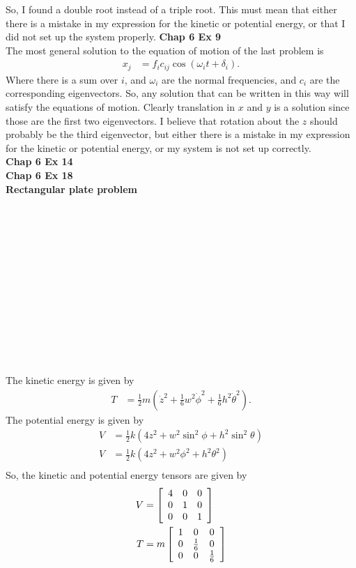 \documentclass[10pt]{article}
\begin{document}
So, I found a double root instead of a triple root.  This must mean that either
there is a mistake in my expression for the kinetic or potential energy, or that
I did not set up the system properly.
\textbf{Chap 6 Ex 9}\\
The most general solution to the equation of motion of the last problem is
\begin{align*}
  x_j &= f_ic_{ij}\cos(\omega_it+\delta_i).
\end{align*}
Where there is a sum over $i$, and $\omega_i$ are the normal frequencies, and
$c_i$ are the corresponding eigenvectors.  So, any solution that can be written
in this way will satisfy the equations of motion.  Clearly translation in $x$
and $y$ is a solution since those are the first two eigenvectors.  I believe that
rotation about the $z$ should probably be the third eigenvector, but either
there is a mistake in my expression for the kinetic or potential energy, or my 
system is not set up correctly.\\
\textbf{Chap 6 Ex 14}\\
\textbf{Chap 6 Ex 18}\\
\textbf{Rectangular plate problem}\\
\\
\\
\\
\\
\\
\\
\\
\\
\\
\\
\\
\\
\\
The kinetic energy is given by
\begin{align*}
  T &= \frac{1}{2}m\left( \dot z^2 +\frac{1}{6}w^2\dot\phi^2 + \frac{1}{6}h^2\dot\theta^2  \right).
\end{align*}
The potential energy is given by
\begin{align*}
  V &= \frac{1}{2}k\left( 4z^2 + w^2\sin^2\phi + h^2\sin^2\theta \right)\\
  V &= \frac{1}{2}k\left( 4z^2 + w^2\phi^2 + h^2\theta^2 \right)\\
\end{align*}
So, the kinetic and potential energy tensors are given by
\begin{align*}
  V &= 
  \left[
  \begin{array}[h]{c c c}
    4 & 0 & 0\\
    0 & 1& 0\\
    0 & 0 & 1\\
  \end{array}
  \right]\\
  T &= 
  m\left[
  \begin{array}[h]{c c c}
    1 & 0 & 0\\
    0 & \frac{1}{6} & 0\\
    0 & 0 & \frac{1}{6}\\
  \end{array}
  \right]
\end{align*}
\end{document}
